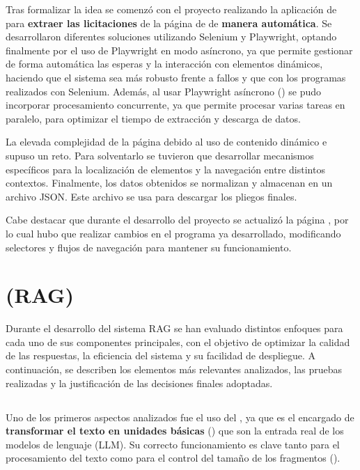 Tras formalizar la idea se comenzó con el proyecto realizando la aplicación de  para \textbf{extraer las licitaciones} de la página de \contsec{} de \textbf{manera automática}. Se desarrollaron diferentes soluciones utilizando Selenium y Playwright, optando finalmente por el uso de Playwright en modo asíncrono, ya que permite gestionar de forma automática las esperas y la interacción con elementos dinámicos, haciendo que el sistema sea más robusto frente a fallos y  que con los programas realizados con Selenium. Además, al usar Playwright asíncrono () se pudo incorporar procesamiento concurrente, ya que permite procesar varias tareas en paralelo, para optimizar el tiempo de extracción y descarga de datos. 

La elevada complejidad de la página debido al uso de contenido dinámico e  supuso un reto. Para solventarlo se tuvieron que desarrollar mecanismos específicos para la localización de elementos y la navegación entre distintos contextos. Finalmente, los datos obtenidos se normalizan y almacenan en un archivo JSON. Este archivo se usa para descargar los pliegos finales.

Cabe destacar que durante el desarrollo del proyecto se actualizó la página \contsec{}, por lo cual hubo que realizar cambios en el programa ya desarrollado, modificando selectores y flujos de navegación para mantener su funcionamiento.

\section{ (RAG)}

Durante el desarrollo del sistema RAG se han evaluado distintos enfoques para cada uno de sus componentes principales, con el objetivo de optimizar la calidad de las respuestas, la eficiencia del sistema y su facilidad de despliegue. A continuación, se describen los elementos más relevantes analizados, las pruebas realizadas y la justificación de las decisiones finales adoptadas.

\subsection{}

Uno de los primeros aspectos analizados fue el uso del , ya que es el encargado de \textbf{transformar el texto en unidades básicas} () que son la entrada real de los modelos de lenguaje (LLM). Su correcto funcionamiento es clave tanto para el procesamiento del texto como para el control del tamaño de los fragmentos ().

